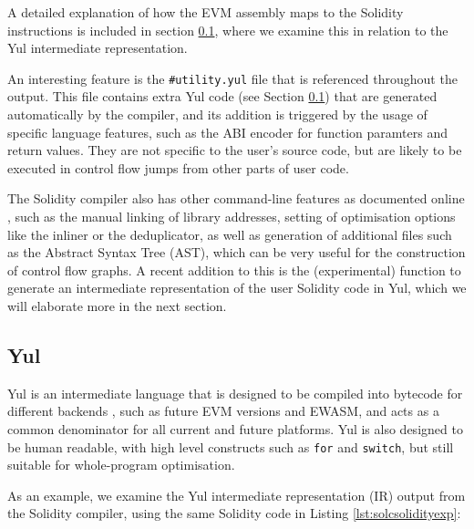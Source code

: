 A detailed explanation of how the EVM assembly maps to the Solidity instructions
is included in section \ref{section:Yul}, where we examine this in relation to the Yul
intermediate representation.

An interesting feature is the \texttt{\#utility.yul} file that is referenced throughout
the output. This file contains extra Yul code (see Section \ref{section:Yul}) that are
generated automatically by the compiler, and its addition is triggered by the usage of
specific language features, such as the ABI encoder for function paramters and return values.
They are not specific to the user's source code, but are likely to be executed in control flow
jumps from other parts of user code.

The Solidity compiler also has other command-line features as documented online 
\cite{solcinputoptions}, such as the manual linking of library addresses, setting of 
optimisation options like the inliner or the deduplicator, as well as generation of
additional files such as the Abstract Syntax Tree (AST), which can be very useful for the 
construction of control flow graphs. A recent addition to this
is the (experimental) function to generate an intermediate representation of the user Solidity code in
Yul, which we will elaborate more in the next section.

\subsection{Yul}
\label{section:Yul}

Yul is an intermediate language that is designed to be compiled into bytecode for different
backends \cite{solcyul}, such as future EVM versions and EWASM, and acts as a common denominator
for all current and future platforms. Yul is also designed to be human readable, with high level constructs
such as \texttt{for} and \texttt{switch}, but still suitable for whole-program optimisation.

As an example, we examine the Yul intermediate representation (IR) output from the Solidity compiler,
using the same Solidity code in Listing \ref{lst:solcsolidityexp}:\\

